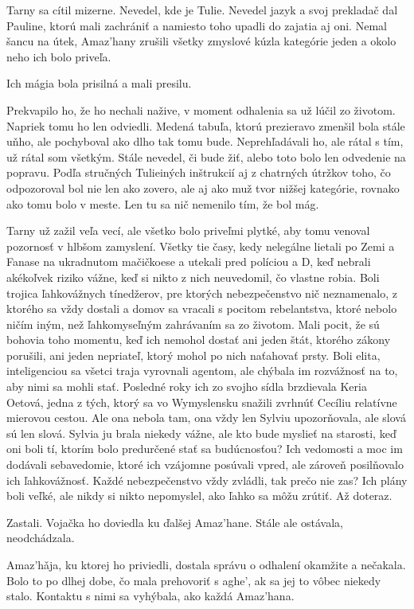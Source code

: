 \documentclass{book}
\begin{document}
Tarny sa cítil mizerne. Nevedel, kde je Tulie. Nevedel jazyk a svoj prekladač dal Pauline, ktorú mali zachrániť a namiesto toho upadli do zajatia aj oni. Nemal šancu na útek, Amaz'hany zrušili všetky zmyslové kúzla kategórie jeden a okolo neho ich bolo priveľa.

Ich mágia bola prisilná a mali presilu.

Prekvapilo ho, že ho nechali nažive, v moment odhalenia sa už lúčil zo životom. Napriek tomu ho len odviedli. Medená tabuľa, ktorú prezieravo zmenšil bola stále uňho, ale pochyboval ako dlho tak tomu bude. Neprehľadávali ho, ale rátal s tím, už rátal som všetkým. Stále nevedel, či bude žiť, alebo toto bolo len odvedenie na popravu. Podľa stručných Tulieiných inštrukcií aj z chatrných útržkov toho, čo odpozoroval bol nie len ako zovero, ale aj ako muž tvor nižšej kategórie, rovnako ako tomu bolo v meste. Len tu sa nič nemenilo tím, že bol mág.

Tarny už zažil veľa vecí, ale všetko bolo priveľmi plytké, aby tomu venoval pozornosť v hlbšom zamyslení. Všetky tie časy, kedy nelegálne lietali po Zemi a Fanase na ukradnutom mačičkoese a utekali pred políciou a D, keď nebrali akékoľvek riziko vážne, keď si nikto z nich neuvedomil, čo vlastne robia. Boli trojica ľahkovážnych tínedžerov, pre ktorých nebezpečenstvo nič neznamenalo, z ktorého sa vždy dostali a domov sa vracali s pocitom rebelantstva, ktoré nebolo ničím iným, než ľahkomyseľným zahrávaním sa zo životom. Mali pocit, že sú bohovia toho momentu, keď ich nemohol dostať ani jeden štát, ktorého zákony porušili, ani jeden nepriateľ, ktorý mohol po nich naťahovať prsty. Boli elita, inteligenciou sa všetci traja vyrovnali agentom, ale chýbala im rozvážnosť na to, aby nimi sa mohli stať. Posledné roky ich zo svojho sídla brzdievala Keria Oetová, jedna z tých, ktorý sa vo Wymyslensku snažili zvrhnúť Cecíliu relatívne mierovou cestou. Ale ona nebola tam, ona vždy len Sylviu upozorňovala, ale slová sú len slová. Sylvia ju brala niekedy vážne, ale kto bude myslieť na starosti, keď oni boli tí, ktorím bolo predurčené stať sa budúcnosťou? Ich vedomosti a moc im dodávali sebavedomie, ktoré ich vzájomne posúvali vpred, ale zároveň posilňovalo ich ľahkovážnosť. Každé nebezpečenstvo vždy zvládli, tak prečo nie zas? Ich plány boli veľké, ale nikdy si nikto nepomyslel, ako ľahko sa môžu zrútiť. Až doteraz.

Zastali. Vojačka ho doviedla ku ďalšej Amaz'hane. Stále ale ostávala, neodchádzala.

Amaz'ha\v{}ja, ku ktorej ho priviedli, dostala správu o odhalení okamžite a nečakala. Bolo to po dlhej dobe, čo mala prehovoriť s aghe', ak sa jej to vôbec niekedy stalo. Kontaktu s nimi sa vyhýbala, ako každá Amaz'hana.
\end{document}
